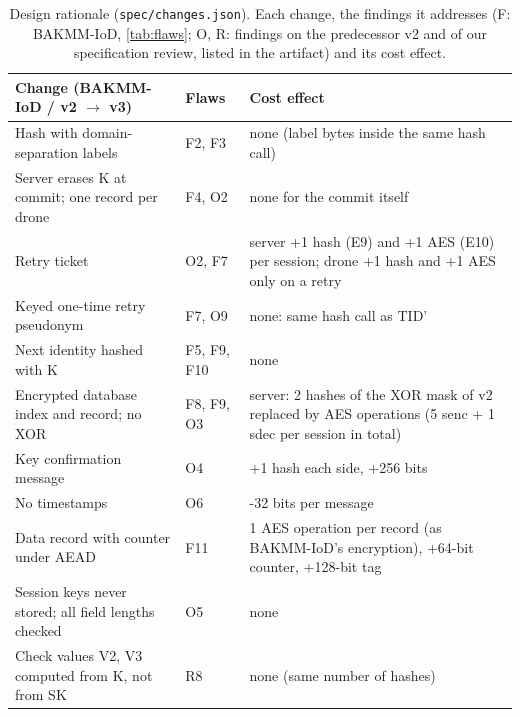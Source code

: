 \begin{table}[!t]
\centering
\footnotesize
\caption{Design rationale (\texttt{spec/changes.json}). Each change, the findings it addresses (F: BAKMM-IoD, \cref{tab:flaws}; O, R: findings on the predecessor v2 and of our specification review, listed in the artifact) and its cost effect.}
\label{tab:rationale}
\setlength{\tabcolsep}{3pt}
\begin{tabular}{p{6.4cm}p{1.6cm}p{6.6cm}}
\toprule
Change (BAKMM-IoD / v2 $\rightarrow$ v3) & Flaws & Cost effect \\
\midrule
Hash with domain-separation labels & F2, F3 & none (label bytes inside the same hash call) \\
Server erases K at commit; one record per drone & F4, O2 & none for the commit itself \\
Retry ticket & O2, F7 & server +1 hash (E9) and +1 AES (E10) per session; drone +1 hash and +1 AES only on a retry \\
Keyed one-time retry pseudonym & F7, O9 & none: same hash call as TID' \\
Next identity hashed with K & F5, F9, F10 & none \\
Encrypted database index and record; no XOR & F8, F9, O3 & server: 2 hashes of the XOR mask of v2 replaced by AES operations (5 senc + 1 sdec per session in total) \\
Key confirmation message & O4 & +1 hash each side, +256 bits \\
No timestamps & O6 & -32 bits per message \\
Data record with counter under AEAD & F11 & 1 AES operation per record (as BAKMM-IoD's encryption), +64-bit counter, +128-bit tag \\
Session keys never stored; all field lengths checked & O5 & none \\
Check values V2, V3 computed from K, not from SK & R8 & none (same number of hashes) \\
\bottomrule
\end{tabular}
\end{table}
